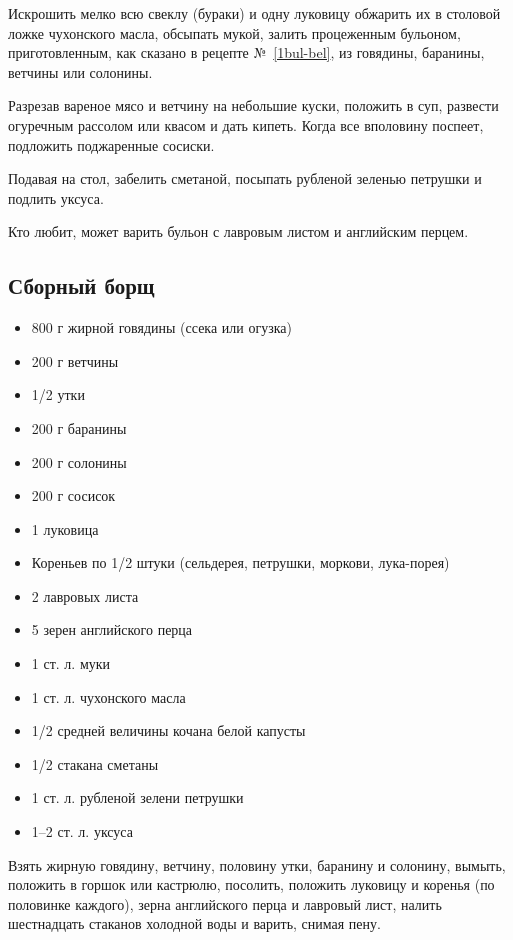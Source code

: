 Искрошить мелко всю свеклу (бураки) и одну луковицу обжарить их в столовой ложке чухонского масла, обсыпать мукой, залить процеженным бульоном, приготовленным, как сказано в рецепте №~\ref{1bul-bel}, из говядины, баранины, ветчины или солонины.

Разрезав вареное мясо и ветчину на небольшие куски, положить в суп, развести огуречным рассолом или квасом и дать кипеть. Когда все вполовину поспеет, подложить поджаренные сосиски.

Подавая на стол, забелить сметаной, посыпать рубленой зеленью петрушки и подлить уксуса.

Кто любит, может варить бульон с лавровым листом и английским перцем.

\subsection{Сборный борщ}\label{32sbor-borsch}

\begin{itemize}
	\item 800 г жирной говядины (ссека или огузка) 
    \item 200 г ветчины 
    \item 1/2 утки 
    \item 200 г баранины 
    \item 200 г солонины
    \item 200 г сосисок 
    \item 1 луковица 
    \item Кореньев по 1/2 штуки (сельдерея, петрушки, моркови, лука-порея)
    \item 2 лавровых листа
    \item 5 зерен английского перца
    \item 1 ст. л. муки
    \item 1 ст. л. чухонского масла
    \item 1/2 средней величины кочана белой капусты 
    \item 1/2 стакана сметаны 
    \item 1 ст. л. рубленой зелени петрушки
    \item 1–2 ст. л. уксуса
\end{itemize}

Взять жирную говядину, ветчину, половину утки, баранину и солонину, вымыть, положить в горшок или кастрюлю, посолить, положить луковицу и коренья (по половинке каждого), зерна английского перца и лавровый лист, налить шестнадцать стаканов холодной воды и варить, снимая пену.

